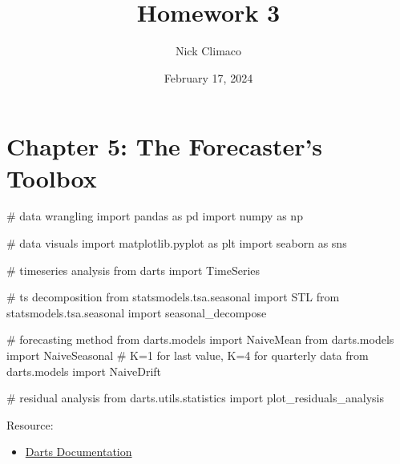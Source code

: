 \documentclass[
  11pt,
]{article}
\title{Homework 3}
\author{Nick Climaco}
\date{February 17, 2024}
\newenvironment{Shaded}{\begin{snugshade}}{\end{snugshade}}
\newcommand{\CommentTok}[1]{\textcolor[rgb]{0.37,0.37,0.37}{#1}}
\newcommand{\ImportTok}[1]{\textcolor[rgb]{0.00,0.46,0.62}{#1}}
\newcommand{\NormalTok}[1]{\textcolor[rgb]{0.00,0.23,0.31}{#1}}
\providecommand{\tightlist}{%
  \setlength{\itemsep}{0pt}\setlength{\parskip}{0pt}}\usepackage{longtable,booktabs,array}
\renewcommand*\contentsname{Table of contents}
\newcommand\contentsname{Table of contents}
\begin{document}
\maketitle


\renewcommand*\contentsname{Table of contents}
{
\hypersetup{linkcolor=}
\setcounter{tocdepth}{3}
\tableofcontents
}
\newpage

\section{Chapter 5: The Forecaster's
Toolbox}\label{chapter-5-the-forecasters-toolbox}

\begin{Shaded}
\begin{Highlighting}[]
\CommentTok{\# data wrangling }
\ImportTok{import}\NormalTok{ pandas }\ImportTok{as}\NormalTok{ pd }
\ImportTok{import}\NormalTok{ numpy }\ImportTok{as}\NormalTok{ np}

\CommentTok{\# data visuals}
\ImportTok{import}\NormalTok{ matplotlib.pyplot }\ImportTok{as}\NormalTok{ plt }
\ImportTok{import}\NormalTok{ seaborn }\ImportTok{as}\NormalTok{ sns}

\CommentTok{\# timeseries analysis}
\ImportTok{from}\NormalTok{ darts }\ImportTok{import}\NormalTok{ TimeSeries}

\CommentTok{\# ts decomposition}
\ImportTok{from}\NormalTok{ statsmodels.tsa.seasonal }\ImportTok{import}\NormalTok{ STL}
\ImportTok{from}\NormalTok{ statsmodels.tsa.seasonal }\ImportTok{import}\NormalTok{ seasonal\_decompose}

\CommentTok{\# forecasting method}
\ImportTok{from}\NormalTok{ darts.models }\ImportTok{import}\NormalTok{ NaiveMean}
\ImportTok{from}\NormalTok{ darts.models }\ImportTok{import}\NormalTok{ NaiveSeasonal }\CommentTok{\# K=1 for last value, K=4 for quarterly data}
\ImportTok{from}\NormalTok{ darts.models }\ImportTok{import}\NormalTok{ NaiveDrift}

\CommentTok{\# residual analysis}
\ImportTok{from}\NormalTok{ darts.utils.statistics }\ImportTok{import}\NormalTok{ plot\_residuals\_analysis}
\end{Highlighting}
\end{Shaded}

Resource:

\begin{itemize}
\tightlist
\item
  \href{https://unit8co.github.io/darts/quickstart/00-quickstart.html}{Darts
  Documentation}
\end{itemize}
\end{document}
